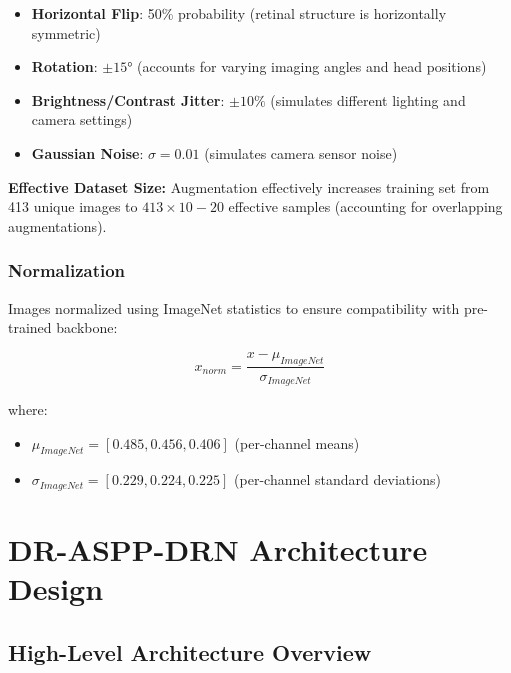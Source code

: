 \documentclass[12pt,a4paper]{article}
\begin{document}
\begin{itemize}
    \item \textbf{Horizontal Flip}: 50\% probability (retinal structure is horizontally symmetric)
    \item \textbf{Rotation}: $\pm 15°$ (accounts for varying imaging angles and head positions)
    \item \textbf{Brightness/Contrast Jitter}: $\pm 10\%$ (simulates different lighting and camera settings)
    \item \textbf{Gaussian Noise}: $\sigma = 0.01$ (simulates camera sensor noise)
\end{itemize}

\textbf{Effective Dataset Size:} Augmentation effectively increases training set from 413 unique images to $413 \times 10-20$ effective samples (accounting for overlapping augmentations).

\subsubsection{Normalization}

Images normalized using ImageNet statistics to ensure compatibility with pre-trained backbone:

\begin{equation}
x_{norm} = \frac{x - \mu_{ImageNet}}{\sigma_{ImageNet}}
\end{equation}

where:
\begin{itemize}
    \item $\mu_{ImageNet} = [0.485, 0.456, 0.406]$ (per-channel means)
    \item $\sigma_{ImageNet} = [0.229, 0.224, 0.225]$ (per-channel standard deviations)
\end{itemize}

\newpage

\section{DR-ASPP-DRN Architecture Design}

\subsection{High-Level Architecture Overview}
\end{document}
